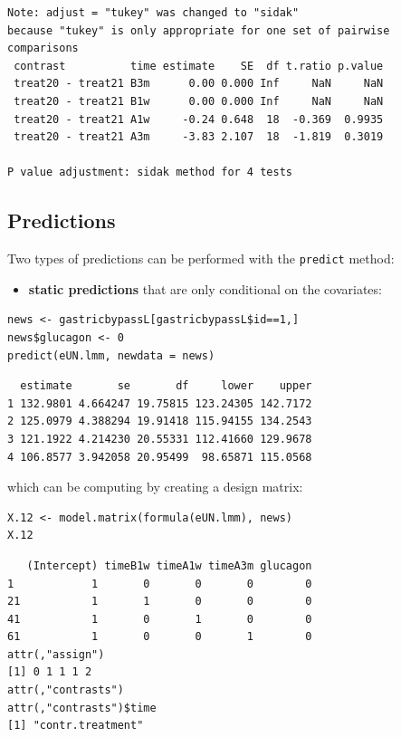 \documentclass[12pt]{article}
\begin{document}
\begin{verbatim}
Note: adjust = "tukey" was changed to "sidak"
because "tukey" is only appropriate for one set of pairwise comparisons
 contrast          time estimate    SE  df t.ratio p.value
 treat20 - treat21 B3m      0.00 0.000 Inf     NaN     NaN
 treat20 - treat21 B1w      0.00 0.000 Inf     NaN     NaN
 treat20 - treat21 A1w     -0.24 0.648  18  -0.369  0.9935
 treat20 - treat21 A3m     -3.83 2.107  18  -1.819  0.3019

P value adjustment: sidak method for 4 tests
\end{verbatim}


\clearpage

\subsection{Predictions}
\label{sec:org4f5eaa3}

Two types of predictions can be performed with the \texttt{predict} method:
\begin{itemize}
\item \textbf{static predictions} that are only conditional on the covariates:
\end{itemize}
\lstset{language=r,label= ,caption= ,captionpos=b,numbers=none}
\begin{lstlisting}
news <- gastricbypassL[gastricbypassL$id==1,]
news$glucagon <- 0
predict(eUN.lmm, newdata = news)
\end{lstlisting}

\begin{verbatim}
  estimate       se       df     lower    upper
1 132.9801 4.664247 19.75815 123.24305 142.7172
2 125.0979 4.388294 19.91418 115.94155 134.2543
3 121.1922 4.214230 20.55331 112.41660 129.9678
4 106.8577 3.942058 20.95499  98.65871 115.0568
\end{verbatim}


which can be computing by creating a design matrix:
\lstset{language=r,label= ,caption= ,captionpos=b,numbers=none}
\begin{lstlisting}
X.12 <- model.matrix(formula(eUN.lmm), news)
X.12
\end{lstlisting}

\begin{verbatim}
   (Intercept) timeB1w timeA1w timeA3m glucagon
1            1       0       0       0        0
21           1       1       0       0        0
41           1       0       1       0        0
61           1       0       0       1        0
attr(,"assign")
[1] 0 1 1 1 2
attr(,"contrasts")
attr(,"contrasts")$time
[1] "contr.treatment"
\end{verbatim}
\end{document}
